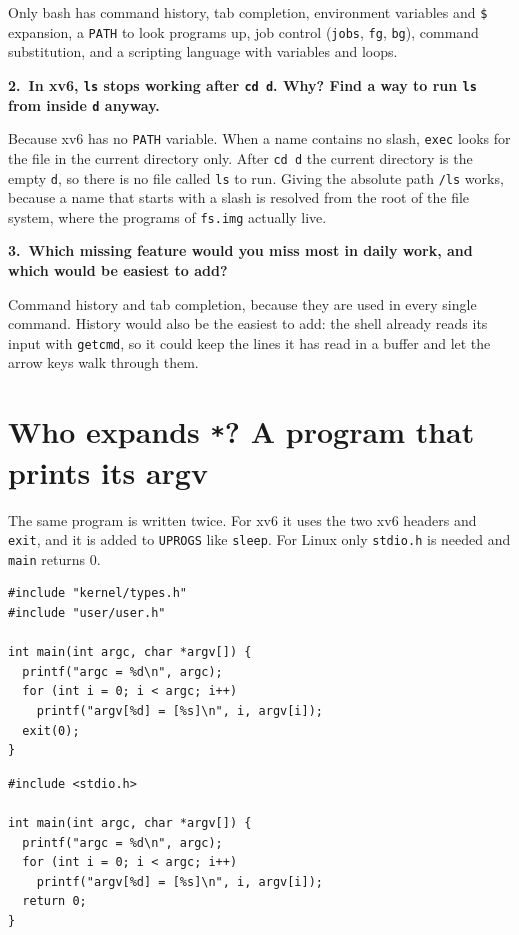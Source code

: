 \documentclass[12pt,a4paper]{article}
\newcommand{\qa}[2]{%
  \par\needspace{5\baselineskip}\medskip
  \noindent\textbf{#1.~#2}\par\smallskip\noindent}
\begin{document}
Only bash has command history, tab completion, environment variables and \texttt{\$} expansion, a \texttt{PATH} to look programs up, job control (\texttt{jobs}, \texttt{fg}, \texttt{bg}), command substitution, and a scripting language with variables and loops.

\qa{2}{In xv6, \texttt{ls} stops working after \texttt{cd d}. Why? Find a way to run \texttt{ls} from inside \texttt{d} anyway.}
Because xv6 has no \texttt{PATH} variable. When a name contains no slash, \texttt{exec} looks for the file in the current directory only. After \texttt{cd d} the current directory is the empty \texttt{d}, so there is no file called \texttt{ls} to run. Giving the absolute path \texttt{/ls} works, because a name that starts with a slash is resolved from the root of the file system, where the programs of \texttt{fs.img} actually live.

\qa{3}{Which missing feature would you miss most in daily work, and which would be easiest to add?}
Command history and tab completion, because they are used in every single command. History would also be the easiest to add: the shell already reads its input with \texttt{getcmd}, so it could keep the lines it has read in a buffer and let the arrow keys walk through them.

\newpage
\section{Who expands \texttt{*}? A program that prints its argv}

The same program is written twice. For xv6 it uses the two xv6 headers and \texttt{exit}, and it is added to \texttt{UPROGS} like \texttt{sleep}. For Linux only \texttt{stdio.h} is needed and \texttt{main} returns 0.

\begin{lstlisting}[style=code,caption={user/args.c for xv6}]
#include "kernel/types.h"
#include "user/user.h"

int main(int argc, char *argv[]) {
  printf("argc = %d\n", argc);
  for (int i = 0; i < argc; i++)
    printf("argv[%d] = [%s]\n", i, argv[i]);
  exit(0);
}
\end{lstlisting}

\begin{lstlisting}[style=code,caption={args\_linux.c for Linux}]
#include <stdio.h>

int main(int argc, char *argv[]) {
  printf("argc = %d\n", argc);
  for (int i = 0; i < argc; i++)
    printf("argv[%d] = [%s]\n", i, argv[i]);
  return 0;
}
\end{lstlisting}
\end{document}
